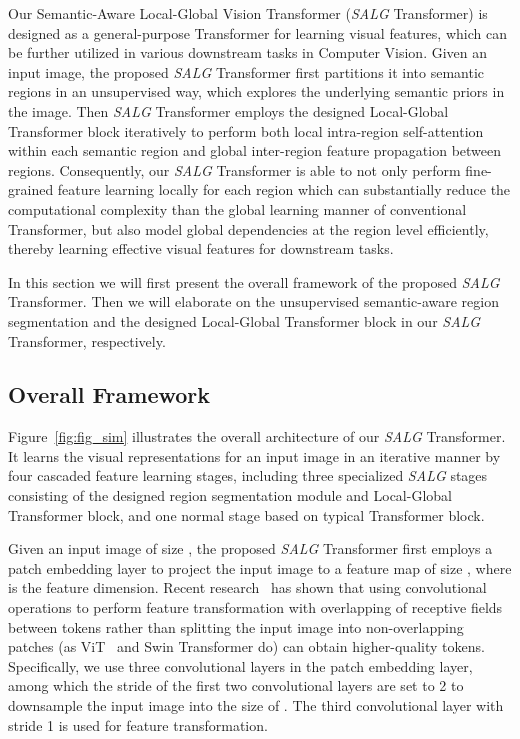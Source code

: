 



Our Semantic-Aware Local-Global Vision Transformer (\emph{SALG} Transformer) is designed as a general-purpose Transformer for learning visual features, which can be further utilized in various downstream tasks in Computer Vision. Given an input image, the proposed \emph{SALG} Transformer first partitions it into semantic regions in an unsupervised way, which explores the underlying semantic priors in the image. Then \emph{SALG} Transformer employs the designed Local-Global Transformer block iteratively to perform both local intra-region self-attention within each semantic region and global inter-region feature propagation between regions. Consequently, our \emph{SALG} Transformer is able to not only perform fine-grained feature learning locally for each region which can substantially reduce the computational complexity than the global learning manner of conventional Transformer, but also model global dependencies at the region level efficiently, thereby learning effective visual features for downstream tasks.

In this section we will first present the overall framework of the proposed \emph{SALG} Transformer. Then we will elaborate on the unsupervised semantic-aware region segmentation and the designed Local-Global Transformer block in our \emph{SALG} Transformer, respectively. 


\subsection{Overall Framework}
\label{sec:3.1}
Figure~\ref{fig:fig_sim} illustrates the overall architecture of our \emph{SALG} Transformer. It learns the visual representations for an input image in an iterative manner by four cascaded feature learning stages, including three specialized \emph{SALG} stages consisting of the designed region segmentation module and Local-Global Transformer block, and one normal stage based on typical Transformer block. 

Given an input image of size , the proposed \emph{SALG} Transformer first employs a patch embedding layer to project the input image to a feature map of size , where  is the feature dimension. Recent research~\cite{wang2021pyramid,wang2022scaled,ren2022shunted} has shown that using convolutional operations to perform feature transformation with overlapping of receptive fields between tokens rather than splitting the input image into non-overlapping patches (as ViT~\cite{dosovitskiy2020image} and Swin Transformer do) can obtain higher-quality tokens. Specifically, we use three convolutional layers in the patch embedding layer, among which the stride of the first two convolutional layers are set to 2 to downsample the input image into the size of . The third convolutional layer with stride 1 is used for feature transformation.

